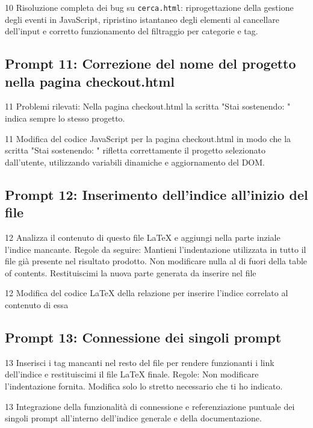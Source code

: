 \documentclass[11pt,a4paper]{article}
\begin{document}
    \begin{respbox}{10}
        Risoluzione completa dei bug su \texttt{cerca.html}: riprogettazione della gestione degli eventi in JavaScript, ripristino istantaneo degli elementi al cancellare dell'input e corretto funzionamento del filtraggio per categorie e tag.
    \end{respbox}

    \subsection{Prompt 11: Correzione del nome del progetto nella pagina checkout.html}
    \label{prompt:11}
    \begin{promptbox}{11}
        Problemi rilevati: Nella pagina checkout.html la scritta "Stai sostenendo: " indica sempre lo stesso progetto.
    \end{promptbox}

    \begin{respbox}{11}
        Modifica del codice JavaScript per la pagina checkout.html in modo che la scritta "Stai sostenendo: " rifletta correttamente il progetto selezionato dall'utente, utilizzando variabili dinamiche e aggiornamento del DOM.
    \end{respbox}

    \subsection{Prompt 12: Inserimento dell'indice all'inizio del file}
    \label{prompt:12}
    \begin{promptbox}{12}
        Analizza il contenuto di questo file LaTeX e aggiungi nella parte inziale l'indice mancante. Regole da seguire: Mantieni l'indentazione utilizzata in tutto il file già presente nel risultato prodotto. Non modificare nulla al di fuori della table of contents. Restituiscimi la nuova parte generata da inserire nel file 
    \end{promptbox}

    \begin{respbox}{12}
        Modifica del codice LaTeX della relazione per inserire l'indice correlato al contenuto di essa
    \end{respbox}

    \subsection{Prompt 13: Connessione dei singoli prompt}
    \label{prompt:13}
    \begin{promptbox}{13}
	Inserisci i tag mancanti nel resto del file per rendere funzionanti i link dell'indice e restituiscimi il file LaTeX finale. Regole: Non modificare l'indentazione fornita. Modifica solo lo stretto necessario che ti ho indicato.
    \end{promptbox}

    \begin{respbox}{13}
        Integrazione della funzionalità di connessione e referenziazione puntuale dei singoli prompt all'interno dell'indice generale e della documentazione.
    \end{respbox}


\newpage
\end{document}
